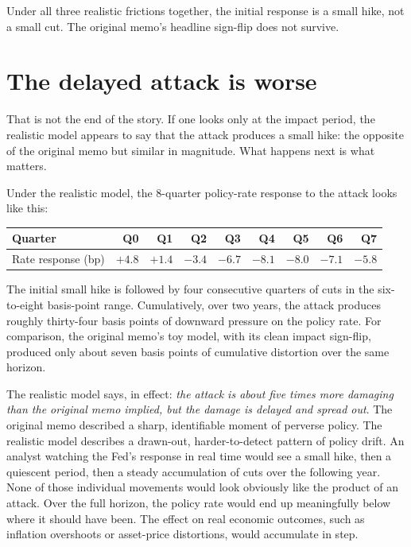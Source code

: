 \documentclass[12pt]{article}
\begin{document}
Under all three realistic frictions together, the initial response is a small hike, not a small cut. The original memo's headline sign-flip does not survive.

\section{The delayed attack is worse}

That is not the end of the story. If one looks only at the impact period, the realistic model appears to say that the attack produces a small hike: the opposite of the original memo but similar in magnitude. What happens next is what matters.

Under the realistic model, the 8-quarter policy-rate response to the attack looks like this:

\begin{center}
\small
\begin{tabular}{lrrrrrrrr}
\toprule
Quarter & Q0 & Q1 & Q2 & Q3 & Q4 & Q5 & Q6 & Q7 \\
\midrule
Rate response (bp) & $+4.8$ & $+1.4$ & $-3.4$ & $-6.7$ & $-8.1$ & $-8.0$ & $-7.1$ & $-5.8$ \\
\bottomrule
\end{tabular}
\end{center}

The initial small hike is followed by four consecutive quarters of cuts in the six-to-eight basis-point range. Cumulatively, over two years, the attack produces roughly thirty-four basis points of downward pressure on the policy rate. For comparison, the original memo's toy model, with its clean impact sign-flip, produced only about seven basis points of cumulative distortion over the same horizon.

The realistic model says, in effect: \emph{the attack is about five times more damaging than the original memo implied, but the damage is delayed and spread out}. The original memo described a sharp, identifiable moment of perverse policy. The realistic model describes a drawn-out, harder-to-detect pattern of policy drift. An analyst watching the Fed's response in real time would see a small hike, then a quiescent period, then a steady accumulation of cuts over the following year. None of those individual movements would look obviously like the product of an attack. Over the full horizon, the policy rate would end up meaningfully below where it should have been. The effect on real economic outcomes, such as inflation overshoots or asset-price distortions, would accumulate in step.
\end{document}
